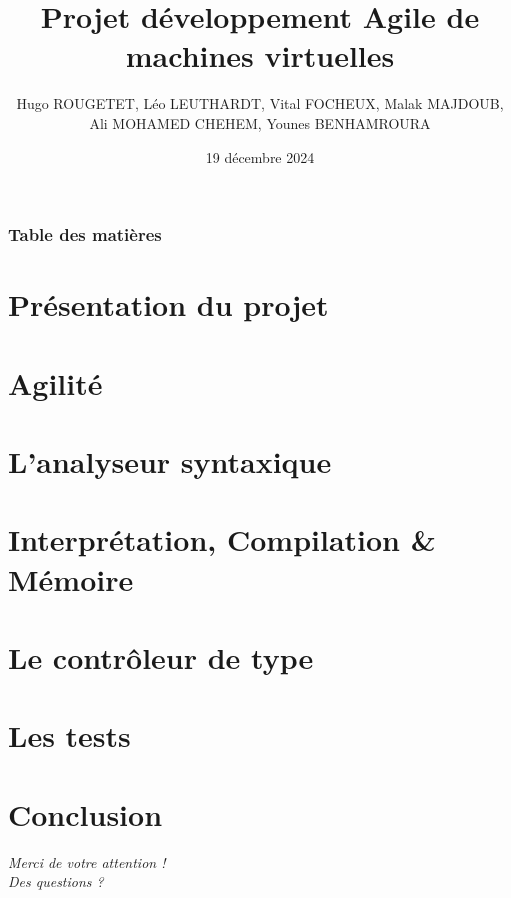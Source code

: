 \documentclass[utf8]{beamer}
\title{Projet développement Agile de machines virtuelles}
\author{Hugo ROUGETET, Léo LEUTHARDT, Vital FOCHEUX, Malak MAJDOUB, \\Ali MOHAMED CHEHEM, Younes BENHAMROURA}
\date{19 décembre 2024}
\begin{document}
\maketitle

\begin{frame}
    \frametitle{Table des matières}
    \tableofcontents
\end{frame}

\section{Présentation du projet}


\section{Agilité}


\section{L'analyseur syntaxique}


\section{Interprétation, Compilation \& Mémoire}


\section{Le contrôleur de type}


\section{Les tests}


\section*{Conclusion}


\begingroup
  \begin{frame}[c]
    \centering
    \begin{minipage}{\textwidth}
      \centering
      \Huge \textsl{Merci de votre attention ! } \\
      \Huge \textsl{Des questions ?}
    \end{minipage}
  \end{frame}
\endgroup
\end{document}
